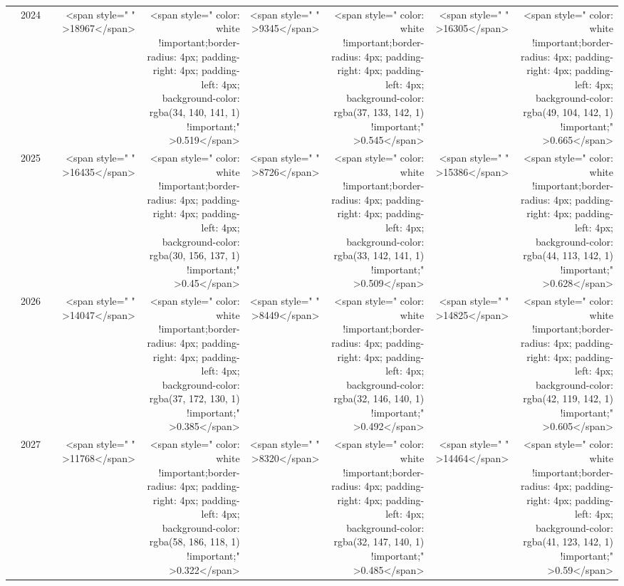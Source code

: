 \begin{table}
\begin{tabular}[t]{>{}l|l>{}rr>{}r|rrrr}
 & 2024 & \cellcolor[HTML]{5E626E}{\textcolor{white}{3854}} & <span style="     " >18967</span> & <span style="     color: white !important;border-radius: 4px; padding-right: 4px; padding-left: 4px; background-color: rgba(34, 140, 141, 1) !important;" >0.519</span> & <span style="     " >9345</span> & <span style="     color: white !important;border-radius: 4px; padding-right: 4px; padding-left: 4px; background-color: rgba(37, 133, 142, 1) !important;" >0.545</span> & <span style="     " >16305</span> & <span style="     color: white !important;border-radius: 4px; padding-right: 4px; padding-left: 4px; background-color: rgba(49, 104, 142, 1) !important;" >0.665</span>\\

 & 2025 & \cellcolor[HTML]{646770}{\textcolor{white}{3631}} & <span style="     " >16435</span> & <span style="     color: white !important;border-radius: 4px; padding-right: 4px; padding-left: 4px; background-color: rgba(30, 156, 137, 1) !important;" >0.45</span> & <span style="     " >8726</span> & <span style="     color: white !important;border-radius: 4px; padding-right: 4px; padding-left: 4px; background-color: rgba(33, 142, 141, 1) !important;" >0.509</span> & <span style="     " >15386</span> & <span style="     color: white !important;border-radius: 4px; padding-right: 4px; padding-left: 4px; background-color: rgba(44, 113, 142, 1) !important;" >0.628</span>\\

 & 2026 & \cellcolor[HTML]{686A71}{\textcolor{white}{3534}} & <span style="     " >14047</span> & <span style="     color: white !important;border-radius: 4px; padding-right: 4px; padding-left: 4px; background-color: rgba(37, 172, 130, 1) !important;" >0.385</span> & <span style="     " >8449</span> & <span style="     color: white !important;border-radius: 4px; padding-right: 4px; padding-left: 4px; background-color: rgba(32, 146, 140, 1) !important;" >0.492</span> & <span style="     " >14825</span> & <span style="     color: white !important;border-radius: 4px; padding-right: 4px; padding-left: 4px; background-color: rgba(42, 119, 142, 1) !important;" >0.605</span>\\

 & 2027 & \cellcolor[HTML]{696B71}{\textcolor{white}{3482}} & <span style="     " >11768</span> & <span style="     color: white !important;border-radius: 4px; padding-right: 4px; padding-left: 4px; background-color: rgba(58, 186, 118, 1) !important;" >0.322</span> & <span style="     " >8320</span> & <span style="     color: white !important;border-radius: 4px; padding-right: 4px; padding-left: 4px; background-color: rgba(32, 147, 140, 1) !important;" >0.485</span> & <span style="     " >14464</span> & <span style="     color: white !important;border-radius: 4px; padding-right: 4px; padding-left: 4px; background-color: rgba(41, 123, 142, 1) !important;" >0.59</span>\\


\end{tabular}
\end{table}
